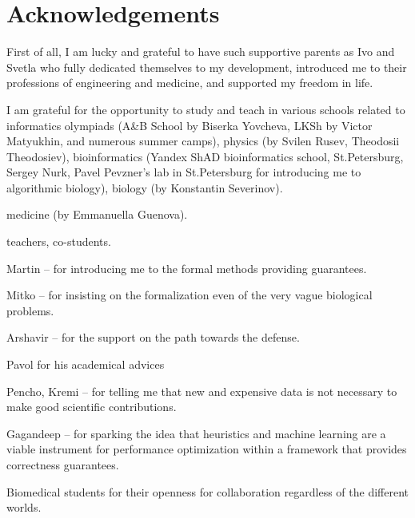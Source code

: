 
\bigskip

\begingroup
\let\clearpage\relax
\let\cleardoublepage\relax
\let\cleardoublepage\relax
\chapter*{Acknowledgements}

\def\thanks#1{%
\begingroup
\leftskip1em
\noindent #1
\par
\endgroup
}

First of all, I am lucky and grateful to have such supportive parents as Ivo and
Svetla who fully dedicated themselves to my development, introduced me to their
professions of engineering and medicine, and supported my freedom in life.

I am grateful for the opportunity to study and teach in various schools related
to informatics olympiads (A\&B School by Biserka Yovcheva, LKSh by Victor
Matyukhin, and numerous summer camps), physics (by Svilen Rusev, Theodosii
Theodosiev), bioinformatics (Yandex ShAD bioinformatics school, St.Petersburg,
Sergey Nurk, Pavel Pevzner's lab in St.Petersburg for introducing me to
algorithmic biology), biology (by Konstantin Severinov).

medicine (by Emmanuella Guenova). 

teachers, co-students.


Martin -- for introducing me to the formal methods providing guarantees.

Mitko -- for insisting on the formalization even of the very vague biological
problems.

Arshavir -- for the support on the path towards the defense.

Pavol for his academical advices

Pencho, Kremi -- for telling me that new and expensive data is not necessary to make
good scientific contributions.

Gagandeep -- for sparking the idea that heuristics and machine learning are a
viable instrument for performance optimization within a framework that provides
correctness guarantees.

Biomedical students for their openness for collaboration regardless of the
different worlds.

